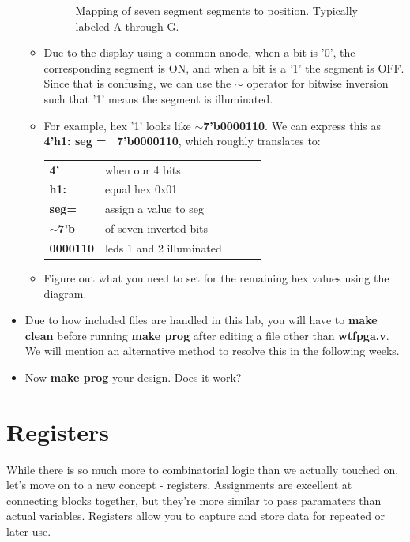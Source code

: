 \documentclass[12pt,a4paper]{article}
\begin{document}
\begin{itemize}
\begin{itemize}
\begin{figure}[H]
\begin{center}
			\caption{Mapping of seven segment segments to position. Typically labeled A through G.}
		\end{center} 
	\end{figure}
		\item Due to the display using a common anode, when a bit is '0', the corresponding segment is ON, and when a bit is a '1' the segment is OFF. Since that is confusing, we can use the $\sim$ operator for bitwise inversion such that '1' means the segment is illuminated. 
		\item For example, hex '1' looks like \textbf{$\sim$7'b0000110}. We can express this as \textbf{4'h1: seg = ~7'b0000110}, which roughly translates to:
		\begin{table}[H]
			\centering
			\begin{tabular}{lllll}
				\textbf{4'}        & when our 4 bits          &  &  &  \\
				\textbf{h1:}       & equal hex 0x01           &  &  &  \\
				\textbf{seg=}   & assign a value to seg    &  &  &  \\
				\textbf{$\sim$7'b} & of seven inverted bits   &  &  &  \\
				\textbf{0000110}   & leds 1 and 2 illuminated &  &  & 
			\end{tabular}
		\end{table}
		\item Figure out what you need to set for the remaining hex values using the diagram. 
	\end{itemize}
	\item Due to how included files are handled in this lab, you will have to \textbf{make clean} before running \textbf{make prog} after editing a file other than \textbf{wtfpga.v}. We will mention an alternative method to resolve this in the following weeks. 
	\item Now \textbf{make prog} your design. Does it work?
\end{itemize}
\section{Registers}
While there is so much more to combinatorial logic than we actually touched on, let's move on to a new concept - registers. Assignments are excellent at connecting blocks together, but they're more similar to pass paramaters than actual variables. Registers allow you to capture and store data for repeated or later use. \\
\end{document}

